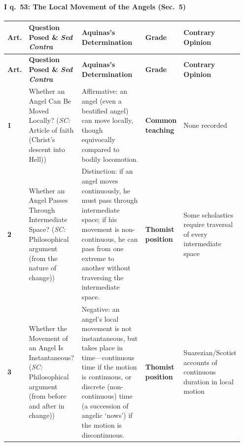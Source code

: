 \paragraph{I q.~53: The Local Movement of the Angels (Sec.~5)}
{\scriptsize
\setlength{\tabcolsep}{2.5pt}
\renewcommand{\arraystretch}{1.15}
\begin{longtable}{>{\raggedright\arraybackslash}p{0.05\linewidth}>{\raggedright\arraybackslash}p{0.23\linewidth}>{\raggedright\arraybackslash}p{0.31\linewidth}>{\raggedright\arraybackslash}p{0.12\linewidth}>{\raggedright\arraybackslash}p{0.24\linewidth}}
\toprule
\textbf{Art.} & \textbf{Question Posed \& \emph{Sed Contra}} & \textbf{Aquinas's Determination} & \textbf{Grade} & \textbf{Contrary Opinion} \\
\midrule
\endfirsthead
\toprule
\textbf{Art.} & \textbf{Question Posed \& \emph{Sed Contra}} & \textbf{Aquinas's Determination} & \textbf{Grade} & \textbf{Contrary Opinion} \\
\midrule
\endhead
\bottomrule
\endfoot
\textbf{1} & Whether an Angel Can Be Moved Locally? (\emph{SC:} Article of faith (Christ's descent into Hell)) & Affirmative: an angel (even a beatified angel) can move locally, though equivocally compared to bodily locomotion. & \textbf{Common teaching} & None recorded \\
\addlinespace[1.5pt]
\textbf{2} & Whether an Angel Passes Through Intermediate Space? (\emph{SC:} Philosophical argument (from the nature of change)) & Distinction: if an angel moves continuously, he must pass through intermediate space; if his movement is non-continuous, he can pass from one extreme to another without traversing the intermediate space. & \textbf{Thomist position} & Some scholastics require traversal of every intermediate space \\
\addlinespace[1.5pt]
\textbf{3} & Whether the Movement of an Angel Is Instantaneous? (\emph{SC:} Philosophical argument (from before and after in change)) & Negative: an angel's local movement is not instantaneous, but takes place in time---continuous time if the motion is continuous, or discrete (non-continuous) time (a succession of angelic `nows') if the motion is discontinuous. & \textbf{Thomist position} & Suarezian/Scotist accounts of continuous duration in local motion \\
\end{longtable}
}

